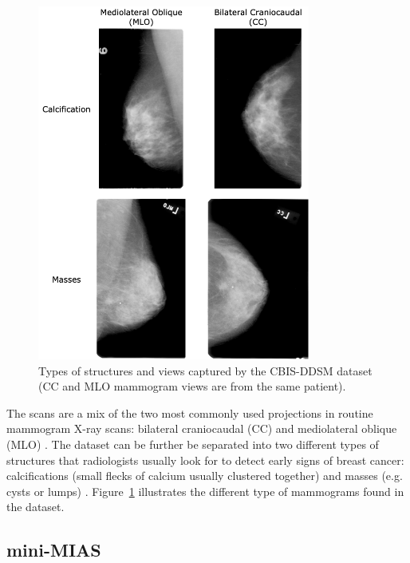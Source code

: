 \begin{figure}[ht]
\centerline{\includegraphics[width=0.8\textwidth]{figures/ethics-datasets/CBIS-DDSM views_types.png}}
\caption{\label{fig:ethics-datasets-CBIS-DDSM views_types}Types of structures and views captured by the CBIS-DDSM dataset (CC and MLO mammogram views are from the same patient).}
\end{figure}

The scans are a mix of the two most commonly used projections in routine mammogram X-ray scans: bilateral craniocaudal (CC) and mediolateral oblique (MLO) \citep{Elter2009}. The dataset can be further be separated into two different types of structures that radiologists usually look for to detect early signs of breast cancer: calcifications (small flecks of calcium usually clustered together) and masses (e.g. cysts or lumps) \citep{breastcancerorg2018}. Figure~\ref{fig:ethics-datasets-CBIS-DDSM views_types} illustrates the different type of mammograms found in the dataset.

\subsection{mini-MIAS}
\label{sec:ethics-mini-MIAS-dataset-description}

